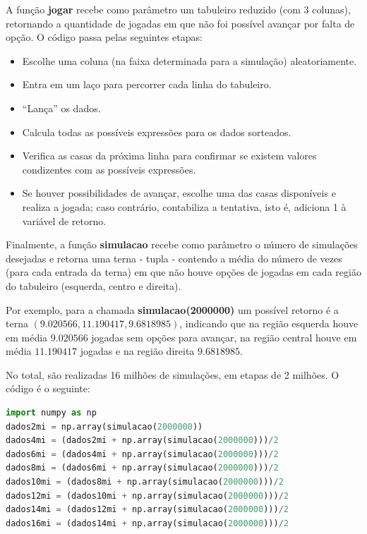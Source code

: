\documentclass[12pt]{article}
\newcommand{\aspas}[1]{``#1''} %
\begin{document}
A função \textbf{jogar} recebe como parâmetro um tabuleiro reduzido (com 3 colunas), retornando a quantidade de jogadas
em que não foi possível avançar por falta de opção. O código passa pelas seguintes etapas:

\begin{itemize}
	\item Escolhe uma coluna (na faixa determinada para a simulação) aleatoriamente.
	\item Entra em um laço para percorrer cada linha do tabuleiro.
	\item \aspas{Lança} os dados.
	\item Calcula todas as possíveis expressões para os dados sorteados.
	\item Verifica as casas da próxima linha para confirmar se existem valores condizentes com as possíveis expressões.
	\item Se houver possibilidades de avançar, escolhe uma das casas disponíveis e realiza a jogada; caso contrário, contabiliza a tentativa, isto é, adiciona 1 à variável de retorno.
\end{itemize}

Finalmente, a função \textbf{simulacao} recebe como parâmetro o número de simulações desejadas e retorna uma terna - tupla - contendo a média do número de vezes (para cada entrada da terna) em que não houve opções de jogadas em cada região do tabuleiro (esquerda, centro e direita). 

Por exemplo, para a chamada \textbf{simulacao(2000000)} um possível retorno é a terna $(9.020566 , 11.190417 ,  9.6818985)$, indicando que na região esquerda houve em média $9.020566$ jogadas sem opções para avançar, na região central houve em média $11.190417$ jogadas e na região direita $9.6818985$.

No total, são realizadas 16 milhões de simulações, em etapas de 2 milhões. O código é o seguinte: 

\begin{lstlisting}[language=Python]
import numpy as np
dados2mi = np.array(simulacao(2000000))
dados4mi = (dados2mi + np.array(simulacao(2000000)))/2
dados6mi = (dados4mi + np.array(simulacao(2000000)))/2
dados8mi = (dados6mi + np.array(simulacao(2000000)))/2
dados10mi = (dados8mi + np.array(simulacao(2000000)))/2
dados12mi = (dados10mi + np.array(simulacao(2000000)))/2
dados14mi = (dados12mi + np.array(simulacao(2000000)))/2
dados16mi = (dados14mi + np.array(simulacao(2000000)))/2
\end{lstlisting}
\end{document}
